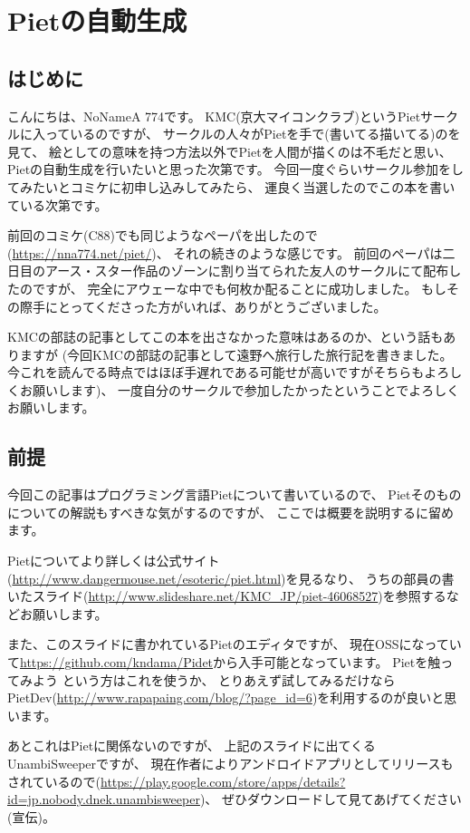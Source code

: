\section{Pietの自動生成}

\subsection{はじめに}

こんにちは、NoNameA 774です。
KMC(京大マイコンクラブ)というPietサークルに入っているのですが、
サークルの人々がPietを手で(書いてる\textbar{}描いてる)のを見て、
絵としての意味を持つ方法以外でPietを人間が描くのは不毛だと思い、
Pietの自動生成を行いたいと思った次第です。
今回一度ぐらいサークル参加をしてみたいとコミケに初申し込みしてみたら、
運良く当選したのでこの本を書いている次第です。

前回のコミケ(C88)でも同じようなペーパを出したので(\url{https://nna774.net/piet/})、
それの続きのような感じです。
前回のペーパは二日目のアース・スター作品のゾーンに割り当てられた友人のサークルにて配布したのですが、
完全にアウェーな中でも何枚か配ることに成功しました。
もしその際手にとってくださった方がいれば、ありがとうございました。

KMCの部誌の記事としてこの本を出さなかった意味はあるのか、という話もありますが
(今回KMCの部誌の記事として遠野へ旅行した旅行記を書きました。
今これを読んでる時点ではほぼ手遅れである可能せが高いですがそちらもよろしくお願いします)、
一度自分のサークルで参加したかったということでよろしくお願いします。

\subsection{前提}

今回この記事はプログラミング言語Pietについて書いているので、
Pietそのものについての解説もすべきな気がするのですが、
ここでは概要を説明するに留めます。

Pietについてより詳しくは公式サイト(\url{http://www.dangermouse.net/esoteric/piet.html})を見るなり、
うちの部員の書いたスライド(\url{http://www.slideshare.net/KMC\_JP/piet-46068527})を参照するなどお願いします。

また、このスライドに書かれているPietのエディタですが、
現在OSSになっていて\url{https://github.com/kndama/Pidet}から入手可能となっています。
Pietを触ってみよう という方はこれを使うか、
とりあえず試してみるだけならPietDev(\url{http://www.rapapaing.com/blog/?page\_id=6})を利用するのが良いと思います。

あとこれはPietに関係ないのですが、
上記のスライドに出てくるUnambiSweeperですが、
現在作者によりアンドロイドアプリとしてリリースもされているので(\url{https://play.google.com/store/apps/details?id=jp.nobody.dnek.unambisweeper})、
ぜひダウンロードして見てあげてください(宣伝)。

